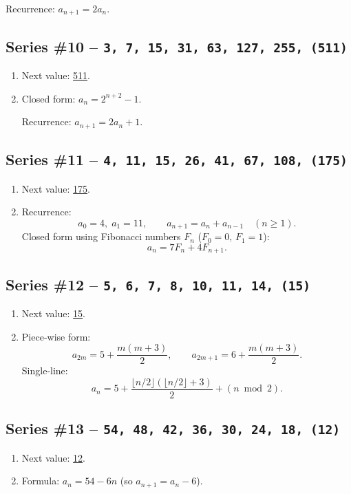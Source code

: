 \documentclass{sn-jnl}
\theoremstyle{definition}
\newcommand{\seq}[1]{\texttt{#1}}
\newcommand{\nextval}[1]{\underline{#1}}
\begin{document}
{\begin{enumerate}[label=(\alph*)]
  Recurrence: $a_{n+1}=2a_n$.
\end{enumerate}

\subsection*{Series \#10 -- \seq{3,\,7,\,15,\,31,\,63,\,127,\,255,\,(511)}}
\begin{enumerate}[label=(\alph*)]
  \item Next value: \nextval{511}.
  \item Closed form: $a_n = 2^{n+2}-1$.
  
  Recurrence: $a_{n+1}=2a_n+1$.
\end{enumerate}

\subsection*{Series \#11 -- \seq{4,\,11,\,15,\,26,\,41,\,67,\,108,\,(175)}}
\begin{enumerate}[label=(\alph*)]
  \item Next value: \nextval{175}.
  \item Recurrence:
  \[
    a_0=4,\;a_1=11,\qquad a_{n+1}=a_n+a_{n-1}\quad(n\ge1).
  \]
  Closed form using Fibonacci numbers $F_n$ ($F_0=0,\,F_1=1$):
  \[a_n = 7F_n+4F_{n+1}.\]
\end{enumerate}

\subsection*{Series \#12 -- \seq{5,\,6,\,7,\,8,\,10,\,11,\,14,\,(15)}}
\begin{enumerate}[label=(\alph*)]
  \item Next value: \nextval{15}.
  \item Piece‑wise form:
  \[
    a_{2m}=5+\frac{m(m+3)}{2},\qquad a_{2m+1}=6+\frac{m(m+3)}{2}.
  \]
  Single‑line:
  \[a_n = 5+\frac{\lfloor n/2\rfloor(\lfloor n/2\rfloor+3)}{2}+(n\bmod 2).\]
\end{enumerate}

\subsection*{Series \#13 -- \seq{54,\,48,\,42,\,36,\,30,\,24,\,18,\,(12)}}
\begin{enumerate}[label=(\alph*)]
  \item Next value: \nextval{12}.
  \item Formula: $a_n = 54-6n$ \;(so $a_{n+1}=a_n-6$).
\end{enumerate}

}
\end{document}
